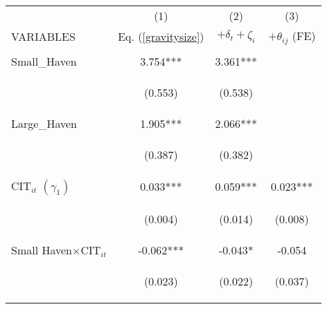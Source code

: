 \begin{center}
\begin{tabular}{lccc} \hline
 & (1) & (2) & (3) \\
VARIABLES & Eq. (\ref{gravitysize}) & $+\delta_t+\zeta_i$ & $+\theta_{ij}$ (FE) \\ \hline
\vspace{4pt} & \begin{footnotesize}\end{footnotesize} & \begin{footnotesize}\end{footnotesize} & \begin{footnotesize}\end{footnotesize} \\
Small\_Haven & 3.754*** & 3.361*** &  \\
\vspace{4pt} & \begin{footnotesize}(0.553)\end{footnotesize} & \begin{footnotesize}(0.538)\end{footnotesize} & \begin{footnotesize}\end{footnotesize} \\
Large\_Haven & 1.905*** & 2.066*** &  \\
\vspace{4pt} & \begin{footnotesize}(0.387)\end{footnotesize} & \begin{footnotesize}(0.382)\end{footnotesize} & \begin{footnotesize}\end{footnotesize} \\
$ \text{CIT}_{it}$ $(\gamma_1)$ & 0.033*** & 0.059*** & 0.023*** \\
\vspace{4pt} & \begin{footnotesize}(0.004)\end{footnotesize} & \begin{footnotesize}(0.014)\end{footnotesize} & \begin{footnotesize}(0.008)\end{footnotesize} \\
Small Haven$\times\text{CIT}_{it}$ & -0.062*** & -0.043* & -0.054 \\
\vspace{4pt} & \begin{footnotesize}(0.023)\end{footnotesize} & \begin{footnotesize}(0.022)\end{footnotesize} & \begin{footnotesize}(0.037)\end{footnotesize} \\

\end{tabular}
\end{center}
